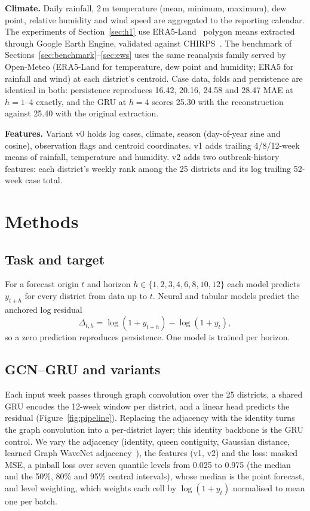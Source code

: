 \textbf{Climate.} Daily rainfall, 2\,m temperature (mean, minimum, maximum), dew point, relative humidity and wind speed are aggregated to the reporting calendar. The experiments of Section~\ref{sec:h1} use ERA5-Land~\cite{munoz2021era5land} polygon means extracted through Google Earth Engine, validated against CHIRPS~\cite{funk2015chirps}. The benchmark of Sections~\ref{sec:benchmark}--\ref{sec:ews} uses the same reanalysis family served by Open-Meteo (ERA5-Land for temperature, dew point and humidity; ERA5 for rainfall and wind) at each district's centroid. Case data, folds and persistence are identical in both: persistence reproduces 16.42, 20.16, 24.58 and 28.47 MAE at $h=1$--4 exactly, and the GRU at $h=4$ scores 25.30 with the reconstruction against 25.40 with the original extraction.

\textbf{Features.} Variant v0 holds log cases, climate, season (day-of-year sine and cosine), observation flags and centroid coordinates. v1 adds trailing 4/8/12-week means of rainfall, temperature and humidity. v2 adds two outbreak-history features: each district's weekly rank among the 25 districts and its log trailing 52-week case total.

\section{Methods}
\label{sec:methods}

\subsection{Task and target}
For a forecast origin $t$ and horizon $h\in\{1,2,3,4,6,8,10,12\}$ each model predicts $y_{t+h}$ for every district from data up to $t$. Neural and tabular models predict the anchored log residual
\[
\Delta_{t,h}=\log(1+y_{t+h})-\log(1+y_t),
\]
so a zero prediction reproduces persistence. One model is trained per horizon.

\subsection{GCN--GRU and variants}
Each input week passes through graph convolution over the 25 districts, a shared GRU encodes the 12-week window per district, and a linear head predicts the residual (Figure~\ref{fig:pipeline}). Replacing the adjacency with the identity turns the graph convolution into a per-district layer; this identity backbone is the GRU control. We vary the adjacency (identity, queen contiguity, Gaussian distance, learned Graph WaveNet adjacency~\cite{wu2019graph}), the features (v1, v2) and the loss: masked MSE, a pinball loss over seven quantile levels from 0.025 to 0.975 (the median and the 50\%, 80\% and 95\% central intervals), whose median is the point forecast, and level weighting, which weights each cell by $\log(1+y_t)$ normalised to mean one per batch.

